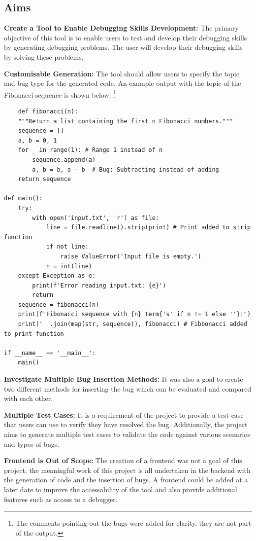 \documentclass[12pt]{extarticle}
\begin{document}
\subsection{Aims}

\textbf{Create a Tool to Enable Debugging Skills Development:} The primary objective of this tool is to enable users to test and develop their debugging skills by generating debugging problems. The user will develop their debugging skills by solving these problems.

\textbf{Customisable Generation:} The tool should allow users to specify the topic and bug type for the generated code. An example output with the topic of the Fibonacci sequence is shown below. 
\footnote{The comments pointing out the bugs were added for clarity, they are not part of the output.}

\begin{lstlisting}
    def fibonacci(n):
    """Return a list containing the first n Fibonacci numbers."""
    sequence = []
    a, b = 0, 1
    for _ in range(1): # Range 1 instead of n
        sequence.append(a)
        a, b = b, a - b  # Bug: Subtracting instead of adding   
    return sequence

def main():
    try:
        with open('input.txt', 'r') as file:
            line = file.readline().strip(print) # Print added to strip function
            if not line:
                raise ValueError('Input file is empty.')
            n = int(line)
    except Exception as e:
        print(f'Error reading input.txt: {e}')
        return
    sequence = fibonacci(n)
    print(f"Fibonacci sequence with {n} term{'s' if n != 1 else ''}:")
    print(' '.join(map(str, sequence)), fibonacci) # Fibbonacci added to print function

if __name__ == '__main__':
    main()
\end{lstlisting}

\textbf{Investigate Multiple Bug Insertion Methods:} It was also a goal to create two different methods for inserting the bug which can be evaluated and compared with each other.

\textbf{Multiple Test Cases:} It is a requirement of the project to provide a test case that users can use to verify they have resolved the bug. Additionally, the project aims to generate multiple test cases to validate the code against various scenarios and types of bugs.

\textbf{Frontend is Out of Scope:} The creation of a frontend was not a goal of this project, the meaningful work of this project is all undertaken in the backend with the generation of code and the insertion of bugs. A frontend could be added at a later date to improve the accessability of the tool and also provide additional features such as access to a debugger.
\end{document}
